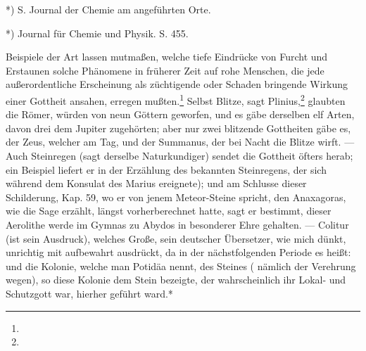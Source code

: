 \documentclass[a4paper, 11pt, oneside, polutonikogreek, german]{article}
\begin{document}
*) S. Journal der Chemie am angeführten Orte.

*) Journal für Chemie und Physik. S. 455.

Beispiele der Art lassen mutmaßen, welche tiefe Eindrücke von Furcht und Erstaunen solche Phänomene in früherer Zeit auf rohe Menschen, die jede außerordentliche Erscheinung als züchtigende oder Schaden bringende Wirkung einer Gottheit ansahen, erregen mußten.\footnote{} Selbst Blitze, sagt Plinius,\footnote{} glaubten die Römer, würden von neun Göttern geworfen, und es gäbe derselben elf Arten, davon drei dem Jupiter zugehörten; aber nur zwei blitzende Gottheiten gäbe es, der Zeus, welcher am Tag, und der Summanus, der bei Nacht die Blitze wirft. --- Auch Steinregen (sagt derselbe Naturkundiger) sendet die Gottheit öfters herab; ein Beispiel liefert er in der Erzählung des bekannten Steinregens, der sich während dem Konsulat des Marius ereignete); und am Schlusse dieser Schilderung, Kap. 59, wo er von jenem Meteor-Steine spricht, den Anaxagoras, wie die Sage erzählt, längst vorherberechnet hatte, sagt er bestimmt, dieser Aerolithe werde im Gymnas zu Abydos in besonderer Ehre gehalten. --- Colitur (ist sein Ausdruck), welches Große, sein deutscher Übersetzer, wie mich dünkt, unrichtig mit aufbewahrt ausdrückt, da in der nächstfolgenden Periode es heißt: und die Kolonie, welche man Potidäa nennt, des Steines ( nämlich der Verehrung wegen), so diese Kolonie dem Stein bezeigte, der wahrscheinlich ihr Lokal- und Schutzgott war, hierher geführt ward.*
\end{document}
